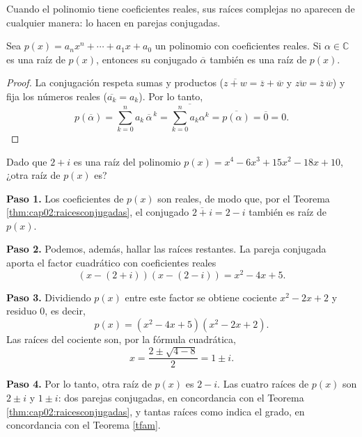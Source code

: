Cuando el polinomio tiene coeficientes reales, sus raíces complejas no aparecen de cualquier manera: lo hacen en parejas conjugadas.

\begin{theorem}\label{thm:cap02:raicesconjugadas}
Sea $p(x)=a_nx^n+\cdots+a_1x+a_0$ un polinomio con coeficientes reales. Si $\alpha \in \mathbb{C}$ es una raíz de $p(x)$, entonces su conjugado $\overline{\alpha}$ también es una raíz de $p(x)$.
\end{theorem}

\begin{proof}
La conjugación respeta sumas y productos ($\overline{z+w}=\overline{z}+\overline{w}$ y $\overline{zw}=\overline{z}\,\overline{w}$) y fija los números reales ($\overline{a_k}=a_k$). Por lo tanto,
$$p\left(\overline{\alpha}\right)=\sum_{k=0}^{n} a_k\,\overline{\alpha}^{\,k}=\overline{\sum_{k=0}^{n} a_k\alpha^{k}}=\overline{p(\alpha)}=\overline{0}=0.$$
\end{proof}

\begin{example}\label{ex:raicesconjugadas}
Dado que $2+i$ es una raíz del polinomio $p(x)=x^4-6x^3+15x^2-18x+10$, ¿otra raíz de $p(x)$ es?
\begin{myproof}
\textbf{Paso 1.} Los coeficientes de $p(x)$ son reales, de modo que, por el Teorema \ref{thm:cap02:raicesconjugadas}, el conjugado $\overline{2+i}=2-i$ también es raíz de $p(x)$.

\textbf{Paso 2.} Podemos, además, hallar las raíces restantes. La pareja conjugada aporta el factor cuadrático con coeficientes reales
$$(x-(2+i))(x-(2-i))=x^2-4x+5.$$

\textbf{Paso 3.} Dividiendo $p(x)$ entre este factor se obtiene cociente $x^2-2x+2$ y residuo $0$, es decir,
$$p(x)=(x^2-4x+5)(x^2-2x+2).$$
Las raíces del cociente son, por la fórmula cuadrática,
$$x=\frac{2\pm\sqrt{4-8}}{2}=1\pm i.$$

\textbf{Paso 4.} Por lo tanto, otra raíz de $p(x)$ es $\boxed{2-i}$. Las cuatro raíces de $p(x)$ son $2\pm i$ y $1\pm i$: dos parejas conjugadas, en concordancia con el Teorema \ref{thm:cap02:raicesconjugadas}, y tantas raíces como indica el grado, en concordancia con el Teorema \ref{tfam}.
\end{myproof}
\end{example}



